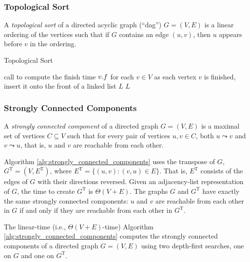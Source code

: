 \subsubsection{Topological Sort}\label{sec:topological_sort}
A \emph{topological sort} of a directed acyclic graph (``dag'') \(G=(V,E)\) is a linear ordering of the vertices such that if \(G\) contains an edge \((u,v)\), then \(u\) appears before \(v\) in the ordering.
\begin{algorithm}[h]
\caption{Topological Sort}\label{alg:topological_sort}
\begin{algorithmic}[1]
  \State call  to compute the finish time \(v\mathtt{.}f\) for each \(v\in V\)
  \State as each vertex \(v\) is finished, insert it onto the front of a linked list \(L\)
  \State \Return \(L\)
\EndFunction
\end{algorithmic}
\end{algorithm}

\subsubsection{Strongly Connected Components}\label{sec:strongly_connected_components}
\begin{definition}\label{def:strongly_connected_component}
A \emph{strongly connected component} of a directed graph \(G=(V,E)\) is a maximal set of vertices \(C\subseteq V\) such that for every pair of vertices \(u,v\in C\), both \(u \leadsto v\) and \(v \leadsto u\), that is, \(u\) and \(v\) are reachable from each other.
\end{definition}

Algorithm \ref{alg:strongly_connected_components} uses the transpose of $G$, $G^{\mathrm{T}}=(V, E^{\mathrm{T}})$, where $E^{\mathrm{T}}=\{(u, v):(v, u) \in E\}$. 
That is, $E^{\mathrm{T}}$ consists of the edges of $G$ with their directions reversed. 
Given an adjacency-list representation of $G$, the time to create $G^{\mathrm{T}}$ is $\Theta(V+E)$. 
The graphs $G$ and $G^{\mathrm{T}}$ have exactly the same strongly connected components: $u$ and $v$ are reachable from each other in $G$ if and only if they are reachable from each other in $G^{\mathrm{T}}$. 

The linear-time (i.e., $\Theta(V+E)$-time) Algorithm \ref{alg:strongly_connected_components} computes the strongly connected components of a directed graph $G=(V, E)$ using two depth-first searches, one on $G$ and one on $G^{\mathrm{T}}$.

